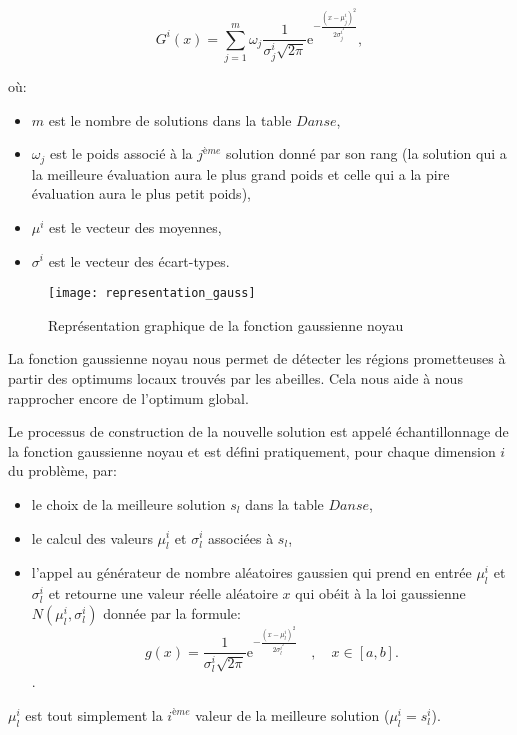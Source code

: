 $$
G^i (x) = \sum^{m}_{j=1} \omega_j \frac{1}{\sigma^i_j \sqrt{2\pi}} \mathrm{e}^{-\frac{(x-\mu^i_j)^2}{2\sigma_j^{i^2}}}
,$$

où:
\begin{itemize}
	\item $m$ est le nombre de solutions dans la table $Danse$,
	\item $\omega_j$ est le poids associé à la $j^{ème}$ solution donné par son rang (la solution qui a la meilleure évaluation aura le plus grand poids et celle qui a la pire évaluation aura le plus petit poids),
	\item $\mu^i$ est le vecteur des moyennes,
	\item $\sigma^i$ est le vecteur des écart-types.\\
\end{itemize} 

\begin{figure}[H]
	\centering
	\texttt{[image: representation\_gauss]}
	\caption[Représentation graphique de la fonction gaussienne noyau]{Représentation graphique de la fonction gaussienne noyau \cite{SOCHA_DORIGO_2006}}
\end{figure}

La fonction gaussienne noyau nous permet de détecter les régions prometteuses à partir des optimums locaux trouvés par les abeilles. Cela nous aide à nous rapprocher encore de l'optimum global.

Le processus de construction de la nouvelle solution est appelé échantillonnage de la fonction gaussienne noyau et est défini pratiquement, pour chaque dimension $i$ du problème, par:

\begin{itemize}
	\item le choix de la meilleure solution $s_l$ dans la table $Danse$,
	\item le calcul des valeurs $\mu^i_l$ et $\sigma^i_l$ associées à $s_l$,
	\item l'appel au générateur de nombre aléatoires gaussien qui prend en entrée $\mu^i_l$ et $\sigma^i_l$ et retourne une valeur réelle aléatoire $x$ qui obéit à la loi gaussienne $N(\mu^i_l,\sigma^i_l)$ donnée par la formule:
	$$
	g(x)= \frac{1}{\sigma^i_l \sqrt{2\pi}} \mathrm{e}^{-\frac{(x-\mu^i_l)^2}{2\sigma_l^{i^2}}} \quad ,\quad x \in [a,b].
	$$
	 .
\end{itemize} 

$\mu^i_l$ est tout simplement la $i^{ème}$ valeur de la meilleure solution ($\mu^i_l=s^i_l$).

